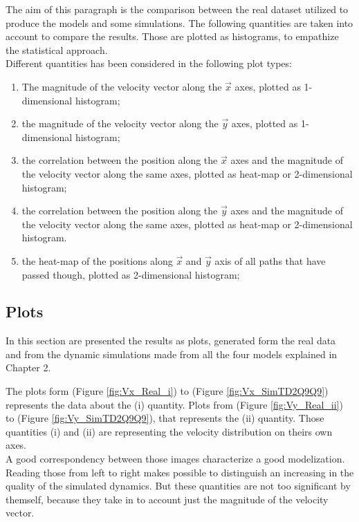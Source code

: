\documentclass[class=article, crop=false]{standalone}
\begin{document}
The aim of this paragraph is the comparison between the real dataset utilized to produce the models and some simulations.
The following quantities are taken into account to compare the results.
Those are plotted as histograms, to empathize the statistical approach.
\\Different quantities has been considered in the following plot types:
\begin{enumerate}[label=(\roman*)]
\item The magnitude of the velocity vector along the $\vec x$ axes, plotted as 1-dimensional histogram;
\item the magnitude of the velocity vector along the $\vec y$ axes, plotted as 1-dimensional histogram;
\item the correlation between the position along the $\vec x$ axes and the magnitude of the velocity vector along the same axes, plotted as heat-map or 2-dimensional histogram;
\item the correlation between the position along the $\vec y$ axes and the magnitude of the velocity vector along the same axes, plotted as heat-map or 2-dimensional histogram.
\item the heat-map of the positions along $\vec x$ and $\vec y$ axis of all paths that have passed though, plotted as 2-dimensional histogram;
\end{enumerate}

\FloatBarrier
\subsection{Plots}
In this section are presented the results as plots, generated form the real data and from the dynamic simulations made from all the four models explained in Chapter 2.

The plots form (Figure \ref{fig:Vx_Real_i}) to (Figure \ref{fig:Vx_SimTD2Q9Q9}) represents the data about the (i) quantity.
Plots from (Figure \ref{fig:Vy_Real_ii}) to (Figure \ref{fig:Vy_SimTD2Q9Q9}), that represents the (ii) quantity.
Those quantities (i) and (ii) are representing the velocity distribution on theirs own axes.
\\ A good correspondency between those images characterize a good modelization.
Reading those from left to right makes possible to distinguish an increasing in the quality of the simulated dynamics.
But these quantities are not too significant by themself, because they take in to account just the magnitude of the velocity vector.
\end{document}
